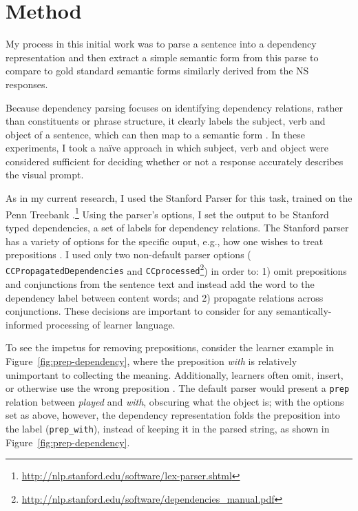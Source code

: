 \section{Method}
\label{sec:method}

My process in this initial work was to parse a sentence into a dependency representation
and then extract a simple semantic
form from this parse
to compare to
gold standard semantic forms similarly derived from the NS responses.

Because dependency parsing focuses on identifying dependency
relations, rather than constituents or phrase structure, it clearly
labels the subject, verb and object of a sentence, which can then map
to a semantic form \citep{Kuebler.McDonald.Nivre-09}. In these experiments, I took a na\"ive approach in which subject, verb and
object were considered sufficient for deciding whether or not a
response accurately describes the visual prompt.

As in my current research, I used the Stanford Parser for this task, trained on the Penn Treebank 
\citep{demarneffe:ea:06, 
klein:manning:03}.\footnote{\url{http://nlp.stanford.edu/software/lex-parser.shtml}} 
%
Using the parser's options, I set the output to be Stanford typed
dependencies, a set of labels for dependency relations. The Stanford
parser has a variety of options for the specific
ouput, e.g., how one wishes to treat prepositions
\citep{defmarneffe:manning:12}.  I used only two non-default parser options ({\tt
  CCPropagatedDependencies} and {\tt CCprocessed}\footnote{\url{http://nlp.stanford.edu/software/dependencies_manual.pdf}}) in order to:
%
1) omit prepositions and conjunctions from the sentence text and
instead add the word to the dependency label between content words;
and 2) propagate relations across conjunctions.  These decisions
are important to consider for any semantically-informed processing of
learner language.

To see the impetus for removing prepositions, consider the learner
example in Figure~\ref{fig:prep-dependency}, where the preposition \textit{with} is
relatively unimportant to collecting the meaning.  Additionally,
learners often omit, insert, or otherwise use the wrong preposition
\citep{chodorow:et:al:07}.  The default parser would present a
\texttt{prep} relation between \textit{played} and \textit{with},
obscuring what the object is; with the options set as above, however,
the dependency representation folds the preposition into the label
(\texttt{prep\_with}), instead of keeping it in the parsed string, as
shown in Figure~\ref{fig:prep-dependency}.

